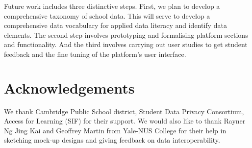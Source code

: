 \documentclass{article}
\begin{document}
\bigbreak
Future work includes three distinctive steps. First, we plan to develop a comprehensive taxonomy of school data. This will serve to develop a comprehensive data vocabulary for applied data literacy and identify data elements. The second step involves prototyping and formalising platform sections and functionality. And the third involves carrying out user studies to get student feedback and the fine tuning of the platform's user interface.

\section{Acknowledgements}
We thank Cambridge Public School district, Student Data Privacy Consortium, Access for Learning (SIF) for their support. We would also like to thank Rayner Ng Jing Kai and Geoffrey Martin from Yale-NUS College for their help in sketching mock-up designs and giving feedback on data interoperability.
\end{document}
